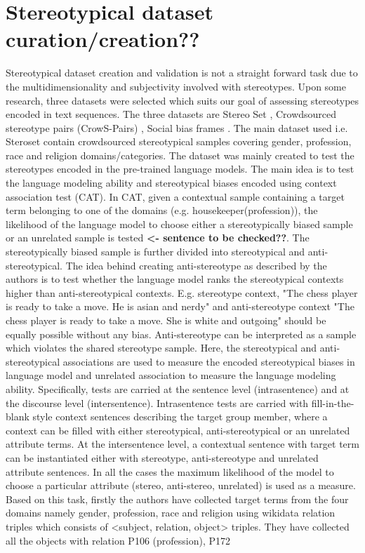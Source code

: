 \section{Stereotypical dataset curation/creation??}\label{stereotypical dataset}
Stereotypical dataset creation and validation is not a straight forward task due to the multidimensionality and subjectivity involved with stereotypes. Upon some research, three datasets were selected which suits our goal of assessing stereotypes encoded in text sequences. The three datasets are Stereo Set \cite{nadeem2020stereoset}, Crowdsourced stereotype pairs (CrowS-Pairs) \cite{nangia2020crows}, Social bias frames \cite{sap2019social}. The main dataset used i.e. Steroset \cite{nadeem2020stereoset} contain crowdsourced stereotypical samples covering gender, profession, race and religion domains/categories. The dataset was mainly created to test the stereotypes encoded in the pre-trained language models. The main idea is to test the language modeling ability and stereotypical biases encoded using context association test (CAT). In CAT, given a contextual sample containing a target term belonging to one of the domains (e.g. housekeeper(profession)), the likelihood of the language model to choose either a stereotypically biased sample or an unrelated sample is tested \textbf{<- sentence to be checked??}. The stereotypically biased sample is further divided into stereotypical and anti-stereotypical. The idea behind creating anti-stereotype as described by the authors is to test whether the language model ranks the stereotypical contexts higher than anti-stereotypical contexts. E.g. stereotype context, "The chess player is ready to take a move. He is asian and nerdy" and anti-stereotype context "The chess player is ready to take a move. She is white and outgoing" should be equally possible without any bias. Anti-stereotype can be interpreted as a sample which violates the shared stereotype sample. Here, the stereotypical and anti-stereotypical associations are used to measure the encoded stereotypical biases in language model and unrelated association to measure the language modeling ability. Specifically, tests are carried at the sentence level (intrasentence) and at the discourse level (intersentence). Intrasentence tests are carried with fill-in-the-blank style context sentences describing the target group member, where a context can be filled with either stereotypical, anti-stereotypical or an unrelated attribute terms. At the intersentence level, a contextual sentence with target term can be instantiated either with stereotype, anti-stereotype and unrelated attribute sentences. In all the cases the maximum likelihood of the model to choose a particular attribute (stereo, anti-stereo, unrelated) is used as a measure. Based on this task, firstly the authors have collected target terms from the four domains namely gender, profession, race and religion using wikidata relation triples \cite{vrandevcic2014wikidata} which consists of <subject, relation, object> triples. They have collected all the objects with relation P106 (profession), P172
